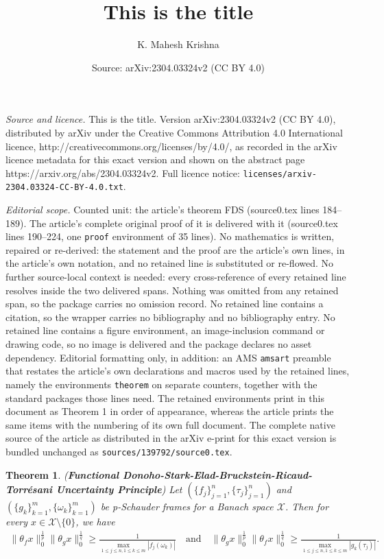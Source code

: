 \documentclass[10pt,a4paper]{amsart}
\title{This is the title}
\author{K. Mahesh Krishna}
\date{Source: arXiv:2304.03324v2 (CC BY 4.0)}
\newtheorem{theorem}{Theorem}
\begin{document}
\maketitle

\noindent\emph{Source and licence.} This is the title. Version arXiv:2304.03324v2 (CC BY 4.0), distributed by arXiv under the Creative Commons Attribution 4.0 International licence, http://creativecommons.org/licenses/by/4.0/, as recorded in the arXiv licence metadata for this exact version and shown on the abstract page https://arxiv.org/abs/2304.03324v2. Full licence notice: \texttt{licenses/arxiv-2304.03324-CC-BY-4.0.txt}.\par\smallskip

\noindent\textit{Editorial scope.} Counted unit: the article's theorem FDS (source0.tex lines 184--189). The article's complete original proof of it is delivered with it (source0.tex lines 190--224, one \texttt{proof} environment of 35 lines). No mathematics is written, repaired or re-derived: the statement and the proof are the article's own lines, in the article's own notation, and no retained line is substituted or re-flowed.  No further source-local context is needed: every cross-reference of every retained line resolves inside the two delivered spans.  Nothing was omitted from any retained span, so the package carries no omission record.  No retained line contains a citation, so the wrapper carries no bibliography and no bibliography entry.  No retained line contains a figure environment, an image-inclusion command or drawing code, so no image is delivered and the package declares no asset dependency.  Editorial formatting only, in addition: an AMS \texttt{amsart} preamble that restates the article's own declarations and macros used by the retained lines, namely the environments \texttt{theorem} on separate counters, together with the standard packages those lines need.  The retained environments print in this document as Theorem 1 in order of appearance, whereas the article prints the same items with the numbering of its own full document.  The complete native source of the article as distributed in the arXiv e-print for this exact version is bundled unchanged as \texttt{sources/139792/source0.tex}.
\begin{theorem} \label{FDS}(\textbf{Functional Donoho-Stark-Elad-Bruckstein-Ricaud-Torr\'{e}sani Uncertainty Principle}) 
Let $(\{f_j\}_{j=1}^n, \{\tau_j\}_{j=1}^n)$ and $(\{g_k\}_{k=1}^m, \{\omega_k\}_{k=1}^m)$ be  p-Schauder frames  for a Banach space $\mathcal{X}$. Then for every $x \in \mathcal{X}\setminus\{0\}$,  we have 
	\begin{align}\label{FDSUNCE}
		\|\theta_f x\|_0^\frac{1}{p}\|\theta_g x\|_0^\frac{1}{q} \geq 	\frac{1}{\displaystyle\max_{1\leq j\leq n, 1\leq k\leq m}|f_j(\omega_k)|}\quad \text{and} \quad \|\theta_g x\|_0^\frac{1}{p}\|\theta_f x\|_0^\frac{1}{q}\geq \frac{1}{\displaystyle\max_{1\leq j\leq n, 1\leq k\leq m}|g_k(\tau_j)|}.
	\end{align}
\end{theorem}
\end{document}
